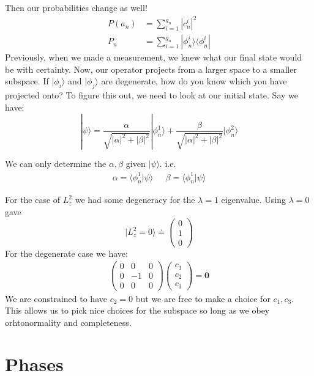 \documentclass[a4paper, 11pt]{article}
\begin{document}
Then our probabilities change as well! 
	\begin{align}
		P(a_n) &= \sum\limits_{i=1}^{g_n} |c_n^i|^2 \\ 
		P_n &= \sum\limits_{i=1}^{g_n} |\phi_n^i\rangle\langle \phi_n^i | 
	\end{align}
Previously, when we made a measurement, we knew what our final state would be with certainty. Now, our operator projects from a larger space to a smaller subspace. If $|\phi_i\rangle$ and $|\phi_j\rangle$ are degenerate, how do you know which you have projected onto? To figure this out, we need to look at our initial state. Say we have:
	\begin{equation*}
		|\psi\rangle = \frac{\alpha}{\sqrt{|\alpha|^2+|\beta|^2}}|\phi_n^1\rangle + \frac{\beta}{\sqrt{|\alpha|^2+|\beta|^2}}|\phi_n^2\rangle
	\end{equation*}

We can only determine the $\alpha, \beta$ given $|\psi\rangle$. i.e. 
	\begin{align*}
		\alpha = \langle \phi_n^1|\psi\rangle &\text{   } \beta = \langle\phi_n^1|\psi\rangle 
	\end{align*}

For the case of $L_z^2$ we had some degeneracy for the $\lambda =1$ eigenvalue. Using $\lambda=0$ gave 
	\begin{equation*}
		|L_z^2 = 0\rangle \doteq \begin{pmatrix}0 \\ 1 \\ 0 \end{pmatrix}
	\end{equation*}
For the degenerate case we have: 
	\begin{align*}
		\begin{pmatrix}
			0 & 0 & 0 \\ 
			0 & -1 & 0 \\ 
			0 & 0 & 0
		\end{pmatrix} \begin{pmatrix}c_1 \\ c_2 \\ c_3\end{pmatrix} = \mathbf{0}
	\end{align*}
We are constrained to have $c_2=0$ but we are free to make a choice for $c_1, c_3$. This allows us to pick nice choices for the subspace so long as we obey orhtonormality and completeness. 



\section*{Phases} 
\end{document}
